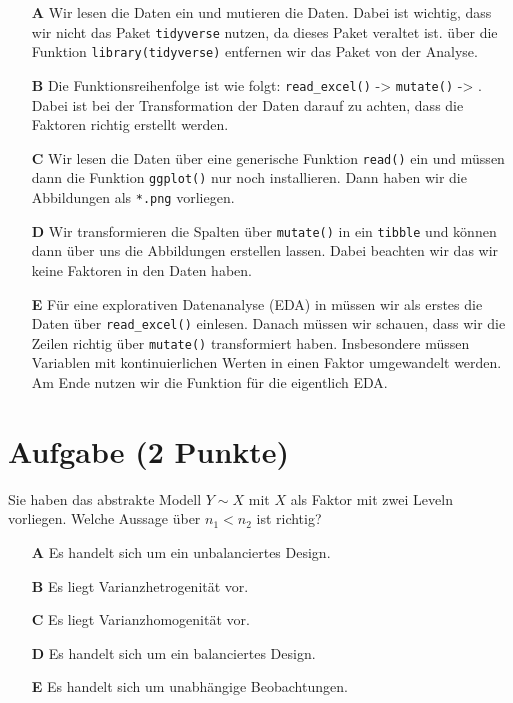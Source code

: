 \documentclass[a4paper, 9pt]{scrartcl}\usepackage[]{graphicx}\usepackage[]{xcolor}
\begin{document}
\begin{enumerate}
\item [\textbf{A} \msquare] Wir lesen die Daten ein und mutieren die Daten. Dabei ist wichtig, dass wir nicht das Paket \texttt{tidyverse} nutzen, da dieses Paket veraltet ist. über die Funktion \texttt{library(tidyverse)} entfernen wir das Paket von der Analyse.
\item [\textbf{B} \msquare] Die Funktionsreihenfolge ist wie folgt: \texttt{read\_excel()} ->  \texttt{mutate()} -> . Dabei ist bei der Transformation der Daten darauf zu achten, dass die Faktoren richtig erstellt werden.
\item [\textbf{C} \msquare] Wir lesen die Daten über eine generische Funktion \texttt{read()} ein und müssen dann die Funktion \texttt{ggplot()} nur noch installieren. Dann haben wir die Abbildungen als \texttt{*.png} vorliegen.
\item [\textbf{D} \msquare] Wir transformieren die Spalten über \texttt{mutate()} in ein \texttt{tibble} und können dann über  uns die Abbildungen erstellen lassen. Dabei beachten wir das wir keine Faktoren in den Daten haben.
\item [\textbf{E} \msquare] Für eine explorativen Datenanalyse (EDA) in \Rlogo müssen wir als erstes die Daten über \texttt{read\_excel()} einlesen. Danach müssen wir schauen, dass wir die Zeilen richtig über \texttt{mutate()} transformiert haben. Insbesondere müssen Variablen mit kontinuierlichen Werten in einen Faktor umgewandelt werden. Am Ende nutzen wir die Funktion  für die eigentlich EDA.
\end{enumerate}

\section{Aufgabe \hfill (2 Punkte)}



Sie haben das abstrakte Modell $Y \sim X$ mit $X$ als Faktor mit zwei Leveln vorliegen. Welche Aussage über $n_1 < n_2$ ist richtig?



\begin{enumerate}
\item [\textbf{A} \msquare] Es handelt sich um ein unbalanciertes Design.
\item [\textbf{B} \msquare] Es liegt Varianzhetrogenität vor.
\item [\textbf{C} \msquare] Es liegt Varianzhomogenität vor.
\item [\textbf{D} \msquare] Es handelt sich um ein balanciertes Design.
\item [\textbf{E} \msquare] Es handelt sich um unabhängige Beobachtungen.
\end{enumerate}
\end{document}
